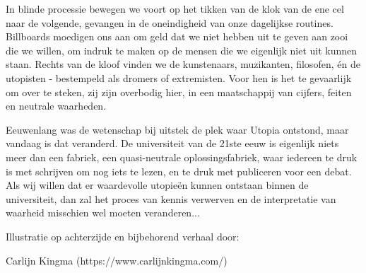 In blinde processie bewegen we voort op het tikken van de klok van de ene cel naar de volgende, gevangen in de oneindigheid van onze dagelijkse routines. Billboards moedigen ons aan om geld dat we niet hebben uit te geven aan zooi die we willen, om indruk te maken op de mensen die we eigenlijk niet uit kunnen staan. Rechts van de kloof vinden we de kunstenaars, muzikanten, filosofen, én de utopisten - bestempeld als dromers of extremisten. Voor hen is het te gevaarlijk om over te steken, zij zijn overbodig hier, in een maatschappij van cijfers, feiten en neutrale waarheden.

Eeuwenlang was de wetenschap bij uitstek de plek waar Utopia ontstond, maar vandaag is dat veranderd. De universiteit van de 21ste eeuw is eigenlijk niets meer dan een fabriek, een quasi-neutrale oplossingsfabriek, waar iedereen te druk is met schrijven om nog iets te lezen, en te druk met publiceren voor een debat. Als wij willen dat er waardevolle utopieën kunnen ontstaan binnen de universiteit, dan zal het proces van kennis verwerven en de interpretatie van waarheid misschien wel moeten veranderen...

\vspace*{\fill}

Illustratie op achterzijde en bijbehorend verhaal door:

Carlijn Kingma (https://www.carlijnkingma.com/)

\newpage


% 

\setcounter{tocdepth}{1}
\tableofcontents
\thispagestyle{empty}

